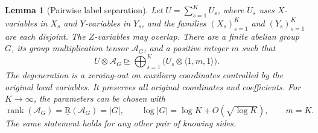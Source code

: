 \documentclass[11pt]{article}
\numberwithin{equation}{section}
\newtheorem{lemma}[theorem]{Lemma}
\theoremstyle{definition}
\theoremstyle{remark}
\begin{document}
\begin{lemma}[Pairwise label separation]
\label{lem:group}
\label{lem:separator}
Let \(U=\sum_{s=1}^{K}U_s\), where \(U_s\) uses \(X\)-variables in
\(X_s\) and \(Y\)-variables in \(Y_s\), and the families
\((X_s)_{s=1}^K\) and \((Y_s)_{s=1}^K\) are each disjoint.  The
\(Z\)-variables may overlap.  There are a finite abelian group \(G\), its
group multiplication tensor \(\mathcal A_G\), and a positive integer
\(m\) such that
\begin{equation}
 U\otimes\mathcal A_G\unrhd
 \bigoplus_{s=1}^{K}\bigl(U_s\otimes\langle1,m,1\rangle\bigr).
 \label{alg:group-identity}
\end{equation}
The degeneration is a zeroing-out on auxiliary coordinates controlled by
the original local variables.  It preserves all original coordinates and
coefficients.  For \(K\to\infty\), the parameters can be chosen with
\begin{equation}
 \operatorname{rank}(\mathcal A_G)=\operatorname{\underline R}(\mathcal A_G)=|G|,
 \qquad
 \log|G|=\log K+O(\sqrt{\log K}),
 \qquad
 m=K.
 \label{alg:group-rates}
\end{equation}
The same statement holds for any other pair of knowing sides.
\end{lemma}
\end{document}
